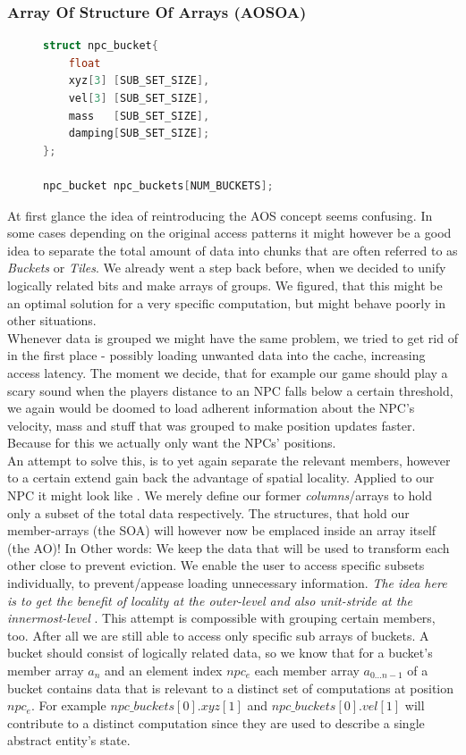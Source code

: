 \subsubsection{Array Of Structure Of Arrays (AOSOA)}\label{aosoa}
\begin{figure}
\begin{lstlisting}[language=C++,numbers=none,name={AOSOA variant of grouped NPC traits},label={aosoa_npc}]
struct npc_bucket{
	float
	xyz[3] [SUB_SET_SIZE],
	vel[3] [SUB_SET_SIZE],
	mass   [SUB_SET_SIZE],
	damping[SUB_SET_SIZE];
};

npc_bucket npc_buckets[NUM_BUCKETS];
\end{lstlisting}
\end{figure}
At first glance the idea of reintroducing the AOS concept seems confusing. In some cases depending on the original access patterns it might however be a good idea to separate the total amount of data into chunks that are often referred to as \textit{Buckets} or \textit{Tiles}. We already went a step back before, when we decided to unify logically related bits and make arrays of groups. We figured, that this might be an optimal solution for a very specific computation, but might behave poorly in other situations.\\
Whenever data is grouped we might have the same problem, we tried to get rid of in the first place - possibly loading unwanted data into the cache, increasing access latency. The moment we decide, that for example our game should play a scary sound when the players distance to an NPC falls below a certain threshold, we again would be doomed to load adherent information about the NPC's velocity, mass and stuff that was grouped to make position updates faster. Because for this we actually only want the NPCs' positions.\\
An attempt to solve this, is to yet again separate the relevant members, however to a certain extend gain back the advantage of spatial locality. Applied to our NPC it might look like . We merely define our former \textit{columns}/arrays to hold only a subset of the total data respectively. The structures, that hold our member-arrays (the SOA) will however now be emplaced inside an array itself (the AO)! In Other words: We keep the data that will be used to transform each other close to prevent eviction. We enable the user to access specific subsets individually, to prevent/appease loading unnecessary information. \textit{The idea here is to get the benefit of locality at the outer-level and also unit-stride at the innermost-level} . This attempt is compossible with grouping certain members, too. After all we are still able to access only specific sub arrays of buckets. A bucket should consist of logically related data, so we know that for a bucket's member array $a_{n}$ and an element index $npc_{e}$ each member array $a_{0\dotsc n-1}$ of a bucket contains data that is relevant to a distinct set of computations at position $npc_{e}$. For example $npc\_buckets[0].xyz[1]$ and $npc\_buckets[0].vel[1]$ will contribute to a distinct computation since they are used to describe a single abstract entity's state.\\
